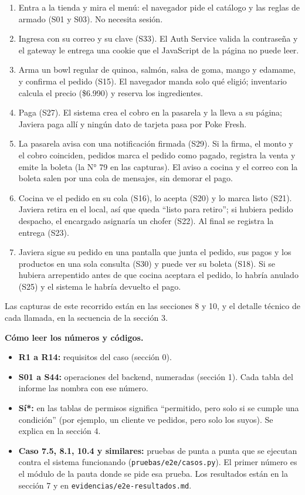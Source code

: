 \begin{enumerate}[nosep,leftmargin=*]
\item Entra a la tienda y mira el menú: el navegador pide el catálogo y las reglas de armado (S01 y S03). No necesita sesión.
\item Ingresa con su correo y su clave (S33). El Auth Service valida la contraseña y el gateway le entrega una cookie que el JavaScript de la página no puede leer.
\item Arma un bowl regular de quinoa, salmón, salsa de goma, mango y edamame, y confirma el pedido (S15). El navegador manda solo qué eligió; inventario calcula el precio (\$6.990) y reserva los ingredientes.
\item Paga (S27). El sistema crea el cobro en la pasarela y la lleva a su página; Javiera paga allí y ningún dato de tarjeta pasa por Poke Fresh.
\item La pasarela avisa con una notificación firmada (S29). Si la firma, el monto y el cobro coinciden, pedidos marca el pedido como pagado, registra la venta y emite la boleta (la N° 79 en las capturas). El aviso a cocina y el correo con la boleta salen por una cola de mensajes, sin demorar el pago.
\item Cocina ve el pedido en su cola (S16), lo acepta (S20) y lo marca listo (S21). Javiera retira en el local, así que queda “listo para retiro”; si hubiera pedido despacho, el encargado asignaría un chofer (S22). Al final se registra la entrega (S23).
\item Javiera sigue su pedido en una pantalla que junta el pedido, sus pagos y los productos en una sola consulta (S30) y puede ver su boleta (S18). Si se hubiera arrepentido antes de que cocina aceptara el pedido, lo habría anulado (S25) y el sistema le habría devuelto el pago.
\end{enumerate}

Las capturas de este recorrido están en las secciones 8 y 10, y el detalle técnico de cada llamada, en la secuencia de la sección 3.


\textbf{Cómo leer los números y códigos.}


\begin{itemize}[nosep,leftmargin=*]
\item \textbf{R1 a R14:} requisitos del caso (sección 0).
\item \textbf{S01 a S44:} operaciones del backend, numeradas (sección 1). Cada tabla del informe las nombra con ese número.
\item \textbf{Sí*:} en las tablas de permisos significa “permitido, pero solo si se cumple una condición” (por ejemplo, un cliente ve pedidos, pero solo los suyos). Se explica en la sección 4.
\item \textbf{Caso 7.5, 8.1, 10.4 y similares:} pruebas de punta a punta que se ejecutan contra el sistema funcionando (\texttt{pruebas/\allowbreak{}e2e/\allowbreak{}casos.\allowbreak{}py}). El primer número es el módulo de la pauta donde se pide esa prueba. Los resultados están en la sección 7 y en \texttt{evidencias/\allowbreak{}e2e-\allowbreak{}resultados.\allowbreak{}md}.
\end{itemize}
